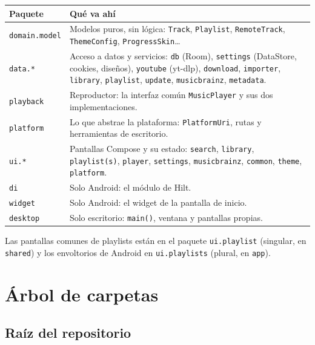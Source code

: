 \documentclass[11pt,a4paper,oneside]{report}
\newcommand{\cod}[1]{\texttt{\small #1}}
\newenvironment{dosCol}[2]{%
  \small
  \begin{longtable}{>{\raggedright\arraybackslash}p{5.3cm} >{\raggedright\arraybackslash}p{10.6cm}}
  \toprule
  \textbf{#1} & \textbf{#2} \\ \midrule \endhead
  \bottomrule \endfoot
}{\end{longtable}}
\begin{document}
\begin{dosCol}{Paquete}{Qué va ahí}
  \cod{domain.model} & Modelos puros, sin lógica: \cod{Track}, \cod{Playlist},
    \cod{RemoteTrack}, \cod{ThemeConfig}, \cod{ProgressSkin}… \\
  \cod{data.*} & Acceso a datos y servicios: \cod{db} (Room), \cod{settings} (DataStore,
    cookies, diseños), \cod{youtube} (yt-dlp), \cod{download}, \cod{importer}, \cod{library},
    \cod{playlist}, \cod{update}, \cod{musicbrainz}, \cod{metadata}. \\
  \cod{playback} & Reproductor: la interfaz común \cod{MusicPlayer} y sus dos implementaciones. \\
  \cod{platform} & Lo que abstrae la plataforma: \cod{PlatformUri}, rutas y herramientas de
    escritorio. \\
  \cod{ui.*} & Pantallas Compose y su estado: \cod{search}, \cod{library}, \cod{playlist(s)},
    \cod{player}, \cod{settings}, \cod{musicbrainz}, \cod{common}, \cod{theme}, \cod{platform}. \\
  \cod{di} & Solo Android: el módulo de Hilt. \\
  \cod{widget} & Solo Android: el widget de la pantalla de inicio. \\
  \cod{desktop} & Solo escritorio: \cod{main()}, ventana y pantallas propias. \\
\end{dosCol}

\begin{aviso}
Las pantallas comunes de playlists están en el paquete \cod{ui.playlist} (singular, en
\cod{shared}) y los envoltorios de Android en \cod{ui.playlists} (plural, en \cod{app}).
\end{aviso}

\chapter{Árbol de carpetas}

\section{Raíz del repositorio}
\end{document}
